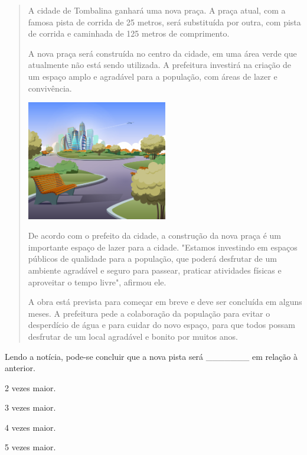 \begin{quote}
A cidade de Tombalina ganhará uma nova praça. A praça atual, com a famosa pista de corrida de 25 metros, será substituída por outra, com pista de corrida e caminhada de 125 metros de comprimento.

A nova praça será construída no centro da cidade, em uma área verde que atualmente não está sendo utilizada. A prefeitura investirá na criação de um espaço amplo e agradável para a população, com áreas de lazer e convivência.

\vspace{1em}
\begin{center}
\includegraphics[width=0.5\textwidth]{./media/image62a.jpeg}
\end{center}
\vspace{1em}

De acordo com o prefeito da cidade, a construção da nova praça é um importante espaço de lazer para a cidade. "Estamos investindo em espaços públicos de qualidade para a população, que poderá desfrutar de um ambiente agradável e seguro para passear, praticar atividades físicas e aproveitar o tempo livre", afirmou ele.

A obra está prevista para começar em breve e deve ser concluída em alguns meses. A prefeitura pede a colaboração da população para evitar o desperdício de água e para cuidar do novo espaço, para que todos possam desfrutar de um local agradável e bonito por muitos anos.

\end{quote}

Lendo a notícia, pode-se concluir que a nova pista será \_\_\_\_\_\_\_ em relação à anterior.

\begin{escolha}
\begin{multicols}{2}
\item
  2 vezes maior.
\item
  3 vezes maior.
\item
  4 vezes maior.
\item
  5 vezes maior.
  \end{multicols}
\end{escolha}

